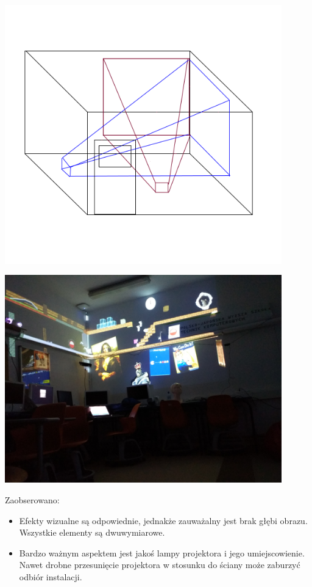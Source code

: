 \begin{center}
\includegraphics[width=0.9\textwidth]{images/mappingv1.png}
\end{center}
\begin{center}
\includegraphics[width=0.9\textwidth]{images/implementacja.jpg}
\end{center}

Zaobserowano:
\begin{itemize}
	\item Efekty wizualne są odpowiednie, jednakże zauważalny jest brak głębi obrazu. Wszystkie elementy są dwuwymiarowe.
	\item Bardzo ważnym aspektem jest jakoś lampy projektora i jego umiejscowienie. Nawet drobne przesunięcie projektora w stosunku do ściany może zaburzyć odbiór instalacji.
\end{itemize}

